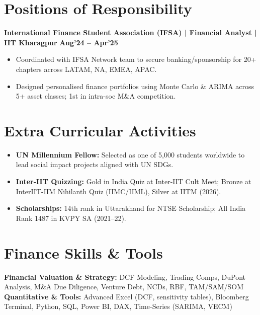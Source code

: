 \documentclass[10pt, a4paper]{article}
\newenvironment{achievelist}{
  \begin{itemize}[leftmargin=1.2em, itemsep=0.5pt, parsep=0pt, topsep=1pt]
    \small
}{
  \end{itemize}
  \vspace{-2pt}
}
\newcommand{\achieve}[1]{\item #1}
\begin{document}
\section{Positions of Responsibility}

\textbf{International Finance Student Association (IFSA) | Financial Analyst | IIT Kharagpur} \hfill \textbf{\small Aug'24 -- Apr'25}
\begin{achievelist}
  \achieve{Coordinated with IFSA Network team to secure banking/sponsorship for 20+ chapters across LATAM, NA, EMEA, APAC.}
  \achieve{Designed personalised finance portfolios using Monte Carlo \& ARIMA across 5+ asset classes; 1st in intra-soc M\&A competition.}
\end{achievelist}

\vspace{-2pt}

\section{Extra Curricular Activities}

\begin{itemize}[leftmargin=1.2em, itemsep=0.5pt, parsep=0pt, topsep=1pt]
  \small
  \item \textbf{UN Millennium Fellow:} Selected as one of 5,000 students worldwide to lead social impact projects aligned with UN SDGs.
  \item \textbf{Inter-IIT Quizzing:} Gold in India Quiz at Inter-IIT Cult Meet; Bronze at InterIIT-IIM Nihilanth Quiz (IIMC/IIML), Silver at IITM (2026).
  \item \textbf{Scholarships:} 14th rank in Uttarakhand for NTSE Scholarship; All India Rank 1487 in KVPY SA (2021--22).
\end{itemize}

\vspace{-2pt}

\section{Finance Skills \& Tools}

\noindent
\textbf{Financial Valuation \& Strategy:} DCF Modeling, Trading Comps, DuPont Analysis, M\&A Due Diligence, Venture Debt, NCDs, RBF, TAM/SAM/SOM \\[2pt]
\textbf{Quantitative \& Tools:} Advanced Excel (DCF, sensitivity tables), Bloomberg Terminal, Python, SQL, Power BI, DAX, Time-Series (SARIMA, VECM)
\end{document}
